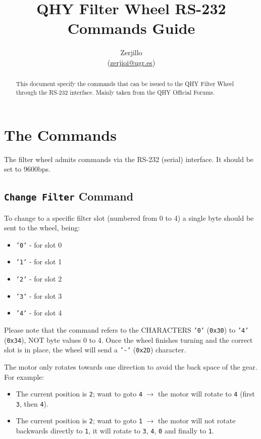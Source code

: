 \documentclass[a4paper,10pt]{article}
\title{QHY Filter Wheel RS-232 Commands Guide}
\author{Zerjillo \\ (\url{zerjioi@ugr.es})}
\date{}
\begin{document}
\maketitle

\begin{abstract}
This document specify the commands that can be issued to the QHY Filter Wheel\cite{qhyofficial} through the RS-232 interface. Mainly taken from the QHY Official Forums\cite{qhyforum}.
\end{abstract}


\section{The Commands}

The filter wheel admits commands via the RS-232 (serial) interface. It should be set to 9600bps.

\subsection{\texttt{Change Filter} Command}

To change to a specific filter slot (numbered from 0 to 4) a single byte should be sent to the wheel, being:

\begin{itemize}
  \item \texttt{'0'} - for slot 0
  \item \texttt{'1'} - for slot 1
  \item \texttt{'2'} - for slot 2
  \item \texttt{'3'} - for slot 3
  \item \texttt{'4'} - for slot 4
\end{itemize}

Please note that the command refers to the CHARACTERS \texttt{'0'} (\texttt{0x30}) to \texttt{'4'} (\texttt{0x34}), NOT byte values 0 to 4. Once the wheel finishes turning and the correct slot is in place, the wheel will send a \texttt{'-'} (\texttt{0x2D}) character.

The motor only rotates towards one direction to avoid the back space of the gear. For example:

\begin{itemize}
 \item The current position is \texttt{2}; want to goto \texttt{4} $\rightarrow$ the motor will rotate to \texttt{4} (first \texttt{3}, then \texttt{4}).
 
 \item The current position is \texttt{2}; want to goto \texttt{1} $\rightarrow$ the motor will not rotate backwards directly to \texttt{1}, it will rotate to \texttt{3}, \texttt{4}, \texttt{0} and finally to \texttt{1}.
\end{itemize}
\end{document}

